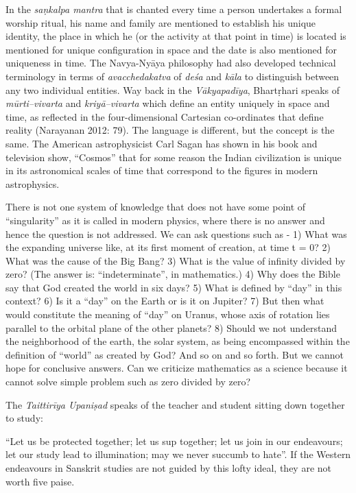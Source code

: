 In the \textit{saṇkalpa mantra} that is chanted every time a person undertakes a formal worship ritual, his name and family are mentioned to establish his unique identity, the place in which he (or the activity at that point in time) is located is mentioned for unique configuration in space and the date is also mentioned for uniqueness in time. The Navya-Nyāya philosophy had also developed technical terminology in terms of \textit{avacchedakatva} of \textit{deśa} and \textit{kāla} to distinguish between any two individual entities. Way back in the \textit{Vākyapadīya}, Bhartṛhari speaks of \textit{mūrti--vivarta} and \textit{kriyā--vivarta} which define an entity uniquely in space and time, as reflected in the four-dimensional Cartesian co-ordinates that define reality (Narayanan 2012: 79). The language is different, but the concept is the same. The American astrophysicist Carl Sagan has shown in his book and television show, “Cosmos” that for some reason the Indian civilization is unique in its astronomical scales of time that correspond to the figures in modern astrophysics.

There is not one system of knowledge that does not have some point of “singularity” as it is called in modern physics, where there is no answer and hence the question is not addressed. We can ask questions such as - 1) What was the expanding universe like, at its first moment of creation, at time t = 0? 2) What was the cause of the Big Bang? 3) What is the value of infinity divided by zero? (The answer is: “indeterminate”, in mathematics.) 4) Why does the Bible say that God created the world in six days? 5) What is defined by “day” in this context? 6) Is it a “day” on the Earth or is it on Jupiter? 7) But then what would constitute the meaning of “day” on Uranus, whose axis of rotation lies parallel to the orbital plane of the other planets? 8) Should we not understand the neighborhood of the earth, the solar system, as being encompassed within the definition of “world” as created by God? And so on and so forth. But we cannot hope for conclusive answers. Can we criticize mathematics as a science because it cannot solve simple problem such as zero divided by zero?

The \textit{Taittirīya Upaniṣad} speaks of the teacher and student sitting down together to study: 

“Let us be protected together; let us sup together; let us join in our endeavours; let our study lead to illumination; may we never succumb to hate”. If the Western endeavours in Sanskrit studies are not guided by this lofty ideal, they are not worth five paise.


